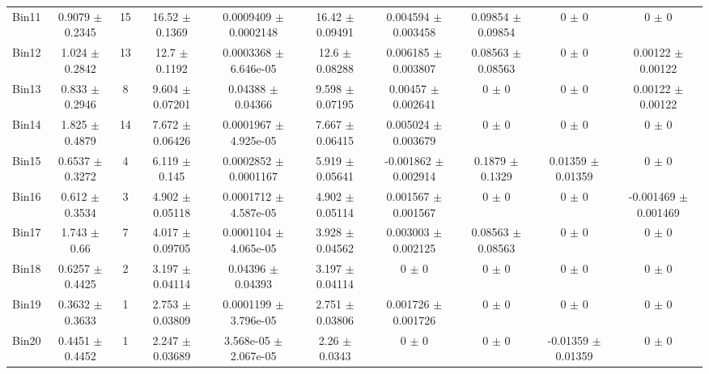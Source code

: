 \begin{tabular}{@{\extracolsep{4pt}}lccccccccc@{}}
     Bin11 & 0.9079 $\pm$ 0.2345 & 15 & 16.52 $\pm$ 0.1369 & 0.0009409 $\pm$ 0.0002148 & 16.42 $\pm$ 0.09491 & 0.004594 $\pm$ 0.003458 & 0.09854 $\pm$ 0.09854 & 0 $\pm$ 0 & 0 $\pm$ 0 \\ 
     Bin12 & 1.024 $\pm$ 0.2842 & 13 & 12.7 $\pm$ 0.1192 & 0.0003368 $\pm$ 6.646e-05 & 12.6 $\pm$ 0.08288 & 0.006185 $\pm$ 0.003807 & 0.08563 $\pm$ 0.08563 & 0 $\pm$ 0 & 0.00122 $\pm$ 0.00122 \\ 
     Bin13 & 0.833 $\pm$ 0.2946 & 8 & 9.604 $\pm$ 0.07201 & 0.04388 $\pm$ 0.04366 & 9.598 $\pm$ 0.07195 & 0.00457 $\pm$ 0.002641 & 0 $\pm$ 0 & 0 $\pm$ 0 & 0.00122 $\pm$ 0.00122 \\ 
     Bin14 & 1.825 $\pm$ 0.4879 & 14 & 7.672 $\pm$ 0.06426 & 0.0001967 $\pm$ 4.925e-05 & 7.667 $\pm$ 0.06415 & 0.005024 $\pm$ 0.003679 & 0 $\pm$ 0 & 0 $\pm$ 0 & 0 $\pm$ 0 \\ 
     Bin15 & 0.6537 $\pm$ 0.3272 & 4 & 6.119 $\pm$ 0.145 & 0.0002852 $\pm$ 0.0001167 & 5.919 $\pm$ 0.05641 & -0.001862 $\pm$ 0.002914 & 0.1879 $\pm$ 0.1329 & 0.01359 $\pm$ 0.01359 & 0 $\pm$ 0 \\ 
     Bin16 & 0.612 $\pm$ 0.3534 & 3 & 4.902 $\pm$ 0.05118 & 0.0001712 $\pm$ 4.587e-05 & 4.902 $\pm$ 0.05114 & 0.001567 $\pm$ 0.001567 & 0 $\pm$ 0 & 0 $\pm$ 0 & -0.001469 $\pm$ 0.001469 \\ 
     Bin17 & 1.743 $\pm$ 0.66 & 7 & 4.017 $\pm$ 0.09705 & 0.0001104 $\pm$ 4.065e-05 & 3.928 $\pm$ 0.04562 & 0.003003 $\pm$ 0.002125 & 0.08563 $\pm$ 0.08563 & 0 $\pm$ 0 & 0 $\pm$ 0 \\ 
     Bin18 & 0.6257 $\pm$ 0.4425 & 2 & 3.197 $\pm$ 0.04114 & 0.04396 $\pm$ 0.04393 & 3.197 $\pm$ 0.04114 & 0 $\pm$ 0 & 0 $\pm$ 0 & 0 $\pm$ 0 & 0 $\pm$ 0 \\ 
     Bin19 & 0.3632 $\pm$ 0.3633 & 1 & 2.753 $\pm$ 0.03809 & 0.0001199 $\pm$ 3.796e-05 & 2.751 $\pm$ 0.03806 & 0.001726 $\pm$ 0.001726 & 0 $\pm$ 0 & 0 $\pm$ 0 & 0 $\pm$ 0 \\ 
     Bin20 & 0.4451 $\pm$ 0.4452 & 1 & 2.247 $\pm$ 0.03689 & 3.568e-05 $\pm$ 2.067e-05 & 2.26 $\pm$ 0.0343 & 0 $\pm$ 0 & 0 $\pm$ 0 & -0.01359 $\pm$ 0.01359 & 0 $\pm$ 0 \\ 
\hline\hline
  \end{tabular}
